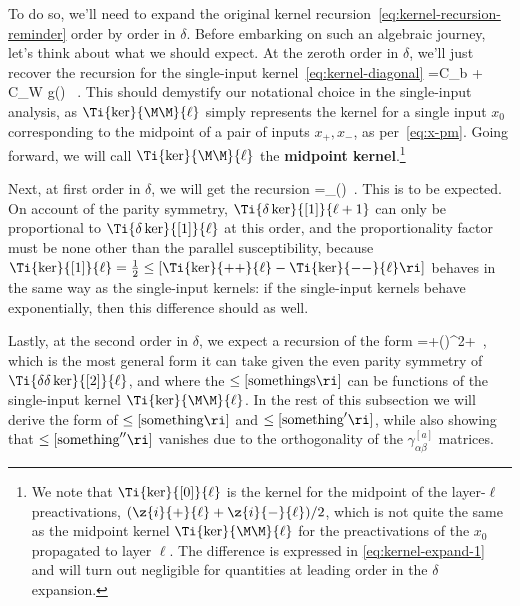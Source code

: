 To do so, we'll need to expand the original kernel recursion~\eqref{eq:kernel-recursion-reminder} order by order in $\delta$.
Before embarking on such an algebraic journey, let's think about what we should expect.
At the zeroth order in $\delta$, we'll just recover the recursion for the single-input kernel~\eqref{eq:kernel-diagonal}
\be
{}=C_b + C_W g\!\le(\Ti{\ker}{\M\M}{\ell}\ri) \, .
\ee
This should demystify our notational choice in the single-input analysis, as %
$\Ti{\ker}{\M\M}{\ell}$ simply represents the kernel for a single input $x_0$ corresponding to the midpoint of a pair of inputs $x_+, x_-$, as per~\eqref{eq:x-pm}. Going forward, we will call $\Ti{\ker}{\M\M}{\ell}$ the \textbf{midpoint kernel}.\footnote{We note that $\Ti{\ker}{[0]}{\ell}$ is the kernel for the midpoint of the layer-$\ell$ preactivations, $(\z{i}{+}{\ell}+\z{i}{-}{\ell})/2$, which is not quite the same as the midpoint kernel $\Ti{\ker}{\M\M}{\ell}$ for the preactivations of the  $x_0$ propagated to layer $\ell$. The difference is expressed in \eqref{eq:kernel-expand-1} and will turn out negligible for quantities at leading order in the $\delta$ expansion.}

Next, at first order in $\delta$, we will get the recursion
\be\label{eq:K1_naive}
=\chi_{\parallel}\!\le(\Ti{\ker}{\M\M}{\ell}\ri)\Ti{\delta \ker}{[1]}{\ell}\, .
\ee
This is to be expected. On account of the parity symmetry, $\Ti{\delta \ker}{[1]}{\ell+1}$ can only be proportional to $\Ti{\delta \ker}{[1]}{\ell}$ at this order, and the proportionality factor must be none other than the parallel susceptibility, because $\Ti{ \ker}{[1]}{\ell}=\frac{1}{2}\le[\Ti{\ker}{++}{\ell}-\Ti{\ker}{--}{\ell} \ri]$ behaves in the same way as the single-input kernels: if the single-input kernels behave exponentially, then this difference should as well.

Lastly, at the second order in $\delta$, we expect a recursion of the form
\be\label{eq:K2_naive}
=\Ti{\delta\delta \ker}{[2]}{\ell}+\le(\Ti{\delta \ker}{[1]}{\ell}\ri)^2+\Ti{\delta\delta\ker}{[0]}{\ell}\, ,
\ee
which is the most general form it can take given the even parity symmetry of $\Ti{\delta\delta \ker}{[2]}{\ell}$, and where the $\le[\text{somethings}\ri]$ can be functions of the single-input kernel $\Ti{\ker}{\M\M}{\ell}$.
In the rest of this subsection we will derive the form of $\le[\text{something}\ri]$ and $\le[\text{something}'\ri]$, while also showing that $\le[\text{something}''\ri]$ vanishes due to the orthogonality of the $\gamma_{\alpha\beta}^{[a]}$ matrices.

